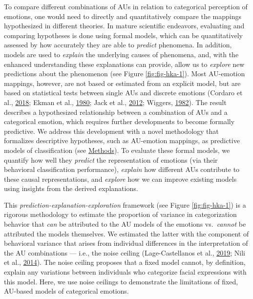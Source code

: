 \documentclass[12pt,american,a4paper,oneside,]{memoir} %
\begin{document}
To compare different combinations of AUs in relation to categorical perception of emotions, one would need to directly and quantitatively compare the mappings hypothesized in different theories. In mature scientific endeavors, evaluating and comparing hypotheses is done using formal models, which can be quantitatively assessed by how accurately they are able to \emph{predict} phenomena. In addition, models are used to \emph{explain} the underlying causes of phenomena, and, with the enhanced understanding these explanations can provide, allow us to \emph{explore} new predictions about the phenomenon (see Figure \ref{fig:fig-hka-1}). Most AU-emotion mappings, however, are not based or estimated from an explicit model, but are based on statistical tests between single AUs and discrete emotions (Cordaro et al., \protect\hyperlink{ref-Cordaro2018-xm}{2018}; Ekman et al., \protect\hyperlink{ref-Ekman1980-of}{1980}; Jack et al., \protect\hyperlink{ref-Jack2012-eq}{2012}; Wiggers, \protect\hyperlink{ref-Wiggers1982-na}{1982}). The result describes a hypothesized relationship between a combination of AUs and a categorical emotion, which requires further developments to become formally predictive. We address this development with a novel methodology that formalizes descriptive hypotheses, such as AU-emotion mappings, as predictive models of classification (see \protect\hyperlink{hka-methods}{Methods}). To evaluate these formal models, we quantify how well they \emph{predict} the representation of emotions (via their behavioral classification performance), \emph{explain} how different AUs contribute to these causal representations, and \emph{explore} how we can improve existing models using insights from the derived explanations.

This \emph{prediction-explanation-exploration} framework (see Figure \ref{fig:fig-hka-1}) is a rigorous methodology to estimate the proportion of variance in categorization behavior that \emph{can} be attributed to the AU models of the emotions vs.~\emph{cannot} be attributed the models themselves. We estimated the latter with the component of behavioral variance that arises from individual differences in the interpretation of the AU combinations --- i.e., the noise ceiling (Lage-Castellanos et al., \protect\hyperlink{ref-lage2019methods}{2019}; Nili et al., \protect\hyperlink{ref-Nili2014-ar}{2014}). The noise ceiling proposes that a fixed model cannot, by definition, explain any variations between individuals who categorize facial expressions with this model. Here, we use noise ceilings to demonstrate the limitations of fixed, AU-based models of categorical emotions.
\end{document}
